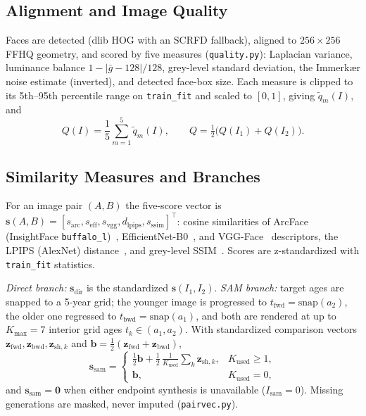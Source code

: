 \documentclass[journal]{IEEEtran}
\newcommand{\vect}[1]{\mathbf{#1}}
\begin{document}
\subsection{Alignment and Image Quality}
Faces are detected (dlib HOG with an SCRFD fallback), aligned to $256\times256$ FFHQ geometry, and scored by five measures (\texttt{quality.py}): Laplacian variance, luminance balance $1-|\bar{g}-128|/128$, grey-level standard deviation, the Immerk{\ae}r noise estimate (inverted), and detected face-box size. Each measure is clipped to its 5th--95th percentile range on \texttt{train\_fit} and scaled to $[0,1]$, giving $\tilde q_m(I)$, and
\begin{equation}
\label{eq:quality}
Q(I)=\frac{1}{5}\sum_{m=1}^{5}\tilde q_m(I),\qquad Q=\tfrac12\big(Q(I_1)+Q(I_2)\big).
\end{equation}

\subsection{Similarity Measures and Branches}
For an image pair $(A,B)$ the five-score vector is $\vect{s}(A,B)=[s_{\text{arc}},s_{\text{eff}},s_{\text{vgg}},d_{\text{lpips}},s_{\text{ssim}}]^{\top}$: cosine similarities of ArcFace (InsightFace \texttt{buffalo\_l})~\cite{deng2019arcface}, EfficientNet-B0~\cite{tan2019efficientnet}, and VGG-Face~\cite{parkhi2015vgg} descriptors, the LPIPS (AlexNet) distance~\cite{zhang2018lpips}, and grey-level SSIM~\cite{wang2004ssim}. Scores are z-standardized with \texttt{train\_fit} statistics.

\emph{Direct branch:} $\vect{s}_{\text{dir}}$ is the standardized $\vect{s}(I_1,I_2)$.
\emph{SAM branch:} target ages are snapped to a 5-year grid; the younger image is progressed to $t_{\text{fwd}}=\text{snap}(a_2)$, the older one regressed to $t_{\text{bwd}}=\text{snap}(a_1)$, and both are rendered at up to $K_{\max}=7$ interior grid ages $t_k\in(a_1,a_2)$. With standardized comparison vectors $\vect{z}_{\text{fwd}},\vect{z}_{\text{bwd}},\vect{z}_{\text{sh},k}$ and $\vect{b}=\frac12(\vect{z}_{\text{fwd}}+\vect{z}_{\text{bwd}})$,
\begin{equation}
\vect{s}_{\text{sam}}=
\begin{cases}
\tfrac12\vect{b}+\tfrac12\,\tfrac{1}{K_{\text{used}}}\sum_{k}\vect{z}_{\text{sh},k}, & K_{\text{used}}\ge1,\\
\vect{b}, & K_{\text{used}}=0,
\end{cases}
\end{equation}
and $\vect{s}_{\text{sam}}=\vect{0}$ when either endpoint synthesis is unavailable ($I_{\text{sam}}=0$). Missing generations are masked, never imputed (\texttt{pairvec.py}).
\end{document}
